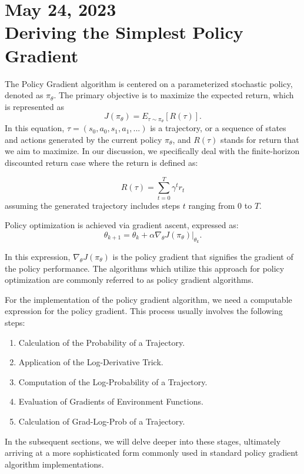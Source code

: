 \section{May 24, 2023\\ 
{\large Deriving the Simplest Policy Gradient}}
The Policy Gradient algorithm is centered on a parameterized stochastic policy, denoted as $\pi_{\theta}$. The primary objective is to maximize the expected return, which is represented as
$$J(\pi_{\theta}) = E_{\tau \sim \pi_{\theta}}\left[{R(\tau)}\right]. $$
In this equation, $\tau=(s_0, a_0, s_1, a_1, ...)$ is a trajectory, or a sequence of states and actions generated by the current policy $\pi_{\theta}$, and $R(\tau)$ stands for return that we aim to maximize. In our discussion, we specifically deal with the finite-horizon discounted return case where the return is defined as:

$$R(\tau) = \sum_{t=0}^{T} \gamma^t r_t$$
assuming the generated trajectory includes steps $t$ ranging from $0$ to $T$.

Policy optimization is achieved via gradient ascent, expressed as:
$$\theta_{k+1} = \theta_k + \alpha \left. \nabla_{\theta} J(\pi_{\theta}) \right|_{\theta_k}.$$

In this expression, $\nabla_{\theta} J(\pi_{\theta})$ is the policy gradient that signifies the gradient of the policy performance. The algorithms which utilize this approach for policy optimization are commonly referred to as policy gradient algorithms.

For the implementation of the policy gradient algorithm, we need a computable expression for the policy gradient. This process usually involves the following steps:

\begin{enumerate}
  \item Calculation of the Probability of a Trajectory.
  \item Application of the Log-Derivative Trick.
  \item Computation of the Log-Probability of a Trajectory.
  \item Evaluation of Gradients of Environment Functions.
  \item Calculation of Grad-Log-Prob of a Trajectory.
\end{enumerate}

In the subsequent sections, we will delve deeper into these stages, ultimately arriving at a more sophisticated form commonly used in standard policy gradient algorithm implementations.


